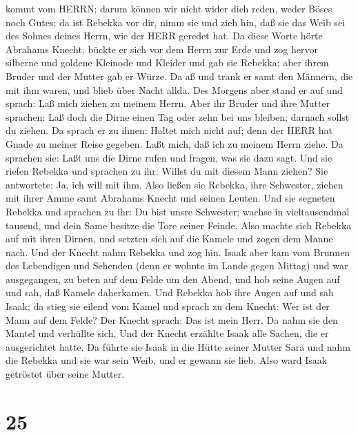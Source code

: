 kommt vom HERRN; darum können wir nicht wider dich reden, weder Böses
noch Gutes;  da ist Rebekka vor dir, nimm sie und zieh hin,
daß sie das Weib sei des Sohnes deines Herrn, wie der HERR geredet hat.
 Da diese Worte hörte Abrahams Knecht, bückte er sich vor
dem Herrn zur Erde  und zog hervor silberne und goldene
Kleinode und Kleider und gab sie Rebekka; aber ihrem Bruder und der
Mutter gab er Würze.  Da aß und trank er samt den Männern,
die mit ihm waren, und blieb über Nacht allda. Des Morgens aber stand er
auf und sprach: Laß mich ziehen zu meinem Herrn.  Aber ihr
Bruder und ihre Mutter sprachen: Laß doch die Dirne einen Tag oder zehn
bei uns bleiben; darnach sollst du ziehen.  Da sprach er zu
ihnen: Haltet mich nicht auf; denn der HERR hat Gnade zu meiner Reise
gegeben. Laßt mich, daß ich zu meinem Herrn ziehe.  Da
sprachen sie: Laßt uns die Dirne rufen und fragen, was sie dazu sagt.
 Und sie riefen Rebekka und sprachen zu ihr: Willst du mit
diesem Mann ziehen? Sie antwortete: Ja, ich will mit ihm. 
Also ließen sie Rebekka, ihre Schwester, ziehen mit ihrer Amme samt
Abrahams Knecht und seinen Leuten.  Und sie segneten
Rebekka und sprachen zu ihr: Du bist unsre Schwester; wachse in
vieltausendmal tausend, und dein Same besitze die Tore seiner Feinde.
 Also machte sich Rebekka auf mit ihren Dirnen, und setzten
sich auf die Kamele und zogen dem Manne nach. Und der Knecht nahm
Rebekka und zog hin.  Isaak aber kam vom Brunnen des
Lebendigen und Sehenden (denn er wohnte im Lande gegen Mittag)
 und war ausgegangen, zu beten auf dem Felde um den Abend,
und hob seine Augen auf und sah, daß Kamele daherkamen. 
Und Rebekka hob ihre Augen auf und sah Isaak; da stieg sie eilend vom
Kamel  und sprach zu dem Knecht: Wer ist der Mann auf dem
Felde? Der Knecht sprach: Das ist mein Herr. Da nahm sie den Mantel und
verhüllte sich.  Und der Knecht erzählte Isaak alle Sachen,
die er ausgerichtet hatte.  Da führte sie Isaak in die
Hütte seiner Mutter Sara und nahm die Rebekka und sie war sein Weib, und
er gewann sie lieb. Also ward Isaak getröstet über seine Mutter.

\hypertarget{section-24}{%
\section{25}\label{section-24}}

